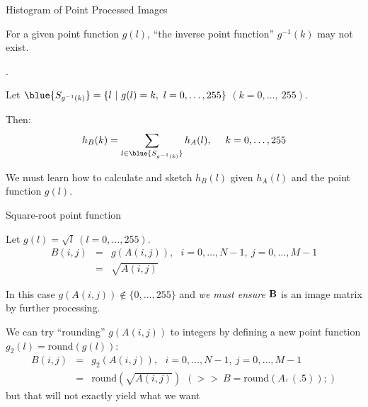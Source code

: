 %
%
\begin{slide}{Histogram of Point Processed Images}
\begin{titlelist}{}{}

\item<2-> 
For a given point function $g(l)$, ``the inverse point
function'' $g^{-1}(k)$ may not exist.

\item<3-> .

\item<4-> 
Let $\blue{S_{g^{-1}(k)}}=\{l\ |\ g(l)=k,\ l=0,\ldots,255\}$
$(k=0,\ldots,\ 255)$.

\item<5-> Then:
\begin{eqnarray}
h_B(k)=\sum_{l\in \blue{S_{g^{-1}(k)}}} h_A(l),\ \ \ \ k=0,\ldots,255
\end{eqnarray}

\item<6-> 
We must learn how to calculate and sketch $h_B(l)$
given $h_A(l)$ and the point function $g(l)$.

\end{titlelist}

\end{slide}


%
%
\begin{slide}{Square-root point function}
\begin{titlelist}{}{}
\small

\item<2-> 
Let $g(l)=\sqrt{l}\ (l=0,\ldots,255)$.
\begin{eqnarray*}
B(i,j)&=&g(A(i,j)),\ \ \ i=0,\ldots,N-1,\ j=0,\ldots,M-1 \\
    &=&\sqrt{A(i,j)}
\end{eqnarray*}

\item<3-> In this case $g(A(i,j)) \not \in \{0,\ldots,255\}$ and {\em we must
ensure} ${\bf B}$ is an image matrix by further processing.

\item<4-> 
We can try ``rounding'' $g(A(i,j))$ to integers by defining
a new point function $g_2(l)=\mbox{round}(g(l))$:
\begin{eqnarray*}
B(i,j)&=& g_2(A(i,j)),\ \ \ i=0,\ldots,N-1,\ j=0,\ldots,M-1 \\
    &=&\mbox{round}(\sqrt{A(i,j)})\ \ (>>\ B=\mbox{round}(A.\hat{\ }(.5));)
\end{eqnarray*}
but that
will not exactly yield what we want %

\end{titlelist}

\end{slide}

